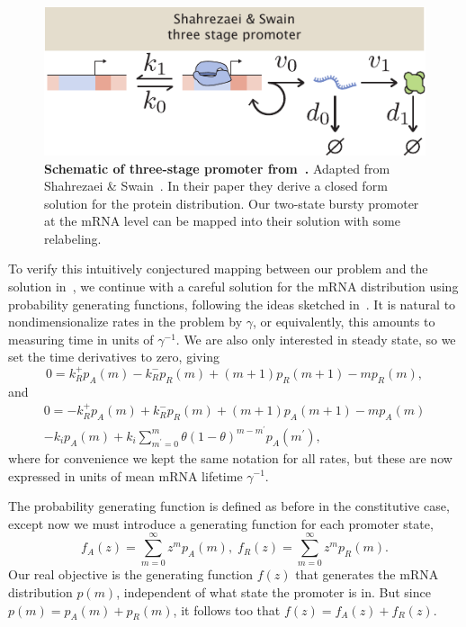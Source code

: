 \begin{figure}
\centering
\includegraphics{../../figures/si/figS0X_Shahrezaei_promoter.pdf}
\caption{\textbf{Schematic of three-stage promoter from~\cite{Shahrezaei2008}.}
Adapted from Shahrezaei \& Swain~\cite{Shahrezaei2008}. In their paper they
derive a closed form solution for the protein distribution. Our two-state bursty
promoter at the mRNA level can be mapped into their solution with some
relabeling.}
\label{fig:shahrezaei}
\end{figure}

To verify this intuitively conjectured mapping between our problem and the
solution in~\cite{Shahrezaei2008}, we continue with a careful solution for the
mRNA distribution using probability generating functions, following the ideas
sketched in~\cite{Shahrezaei2008}. It is natural to nondimensionalize rates in
the problem by $\gamma$, or equivalently, this amounts to measuring time in
units of $\gamma^{-1}$. We are also only interested in steady state, so we set
the time derivatives to zero, giving
\begin{equation}
0 = k_R^+ p_A(m) - k_R^- p_R(m) + (m+1) p_R(m+1) - m p_R(m),
\end{equation}
and
\begin{equation}
\begin{split}
0 = - k_R^+ p_A(m) + k_R^- p_R(m) + (m+1) p_A(m+1) - m p_A(m) 
\\
- k_i p_A(m) + k_i \sum_{m^\prime=0}^m \theta(1-\theta)^{m-m^\prime} p_A(m^\prime),
\end{split}
\end{equation}
where for convenience we kept the same notation for all rates, but these are
now expressed in units of mean mRNA lifetime $\gamma^{-1}$.
        
The probability generating function is defined as before in the constitutive
case, except now we must introduce a generating function for each promoter
state,
\begin{equation}
f_A(z) = \sum_{m=0}^\infty z^m p_A(m),
\;
f_R(z) = \sum_{m=0}^\infty z^m p_R(m).
\end{equation}
Our real objective is the generating function $f(z)$ that generates the mRNA
distribution $p(m)$, independent of what state the promoter is in. But since
$p(m) = p_A(m) + p_R(m)$, it follows too that $f(z) = f_A(z) + f_R(z)$.

